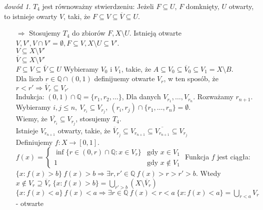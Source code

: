 \documentclass[twoside,10pt]{article}
\theoremstyle{definition}
\theoremstyle{definition}
\theoremstyle{definition}
\theoremstyle{definition}
\theoremstyle{remark}
\newtheorem*{dd}{dowód}
\theoremstyle{definition}
\theoremstyle{definition}
\theoremstyle{definition}
\theoremstyle{definition}
\theoremstyle{definition}
\theoremstyle{definition}
\begin{document}
\begin{dd} 
    $T_4$ jest równoważny stwierdzeniu: Jeżeli $F \subseteq U$, $F$ domknięty, $U$ otwarty, to istnieje 
    owarty $V$, taki, że $ F \subseteq V \subseteq \overline V \subseteq U$. 
    \begin{itemize} 
        \item[$\Rightarrow$] Stosujemy $T_4$ do zbiorów $F, X\setminus U$. Istnieją otwarte $V,V', V \cap V' =
            \emptyset, F \subseteq V, X \setminus U \subseteq V'$. \\
            $V \subseteq X \setminus V'$ \\ 
            $\overline V \subseteq X \setminus V'$ \\ 
            $F \subseteq V \subseteq \overline V \subseteq U$
            Wybieramy $V_0$ i $V_1$, takie, że $A \subseteq V_0 \subseteq \overline V_0 \subseteq 
            V_1 = X \setminus B$. \\ 
            Dla liczb $r \in \mathbb Q \cap (0,1)$ definijuemy otwarte $V_r$, w ten sposób, że 
            $r < r' \Rightarrow \overline V_r \subseteq V_{r'}$ \\ 
            Indukcja: $(0,1) \cap \mathbb Q = \{ r_1,r_2,\ldots \}$, Dla danych $V_{r_1},\ldots,V_{r_n}$. 
            Rozważamy $r_{n+1}$. \\ 
            Wybieramy $i,j \le n, \ V_{r_i} \subseteq V_{r_j},\ (r_i,r_j) \cap \{r_1,\ldots,r_n\} = \emptyset$.\\
            Wiemy, że $\overline{V_{r_i}} \subseteq V_{r_j}$, stosujemy $T_4$. \\ 
            Istnieje $V_{r_{n+1}}$ otwarty, takie, że $\overline V_{r_j} \subseteq V_{r_{n+1}} \subseteq 
            \overline{ V_{r_{n+1}}} \subseteq V_{r_j}$ \\ 
            Definiujemy $f : X \to [0,1]$. $f(x) = \begin{cases} \inf \{r \in (0,r) \cap 
                \mathbb Q : x \in V_r \} &\text{gdy } x \in V_1 \\ 
            1 & \text{gdy } x \notin V_1 \end{cases}$
            Funkcja $f$ jest ciągła: \\ 
            $\{ x : f(x) > b \} \ f(x) > b \Rightarrow \exists r,r' \in \mathbb Q\ f(x) > r > r' > b$. Wtedy 
            $x \notin V_r \supseteq \overline V_r \ \{x : f(x) > b\} = \bigcup\limits_{r' > b} (X \setminus 
            \overline V_r)$\\ 
            $\{x : f(x) < a \} \ f(x) < a \Rightarrow \exists r \in \mathbb Q \ f(x) < r < a \
            \{ x: f(x) < a \} = \bigcup\limits_{r < a} V_r$ - otwarte
    \end{itemize} 
\end{dd} 
\end{document}
